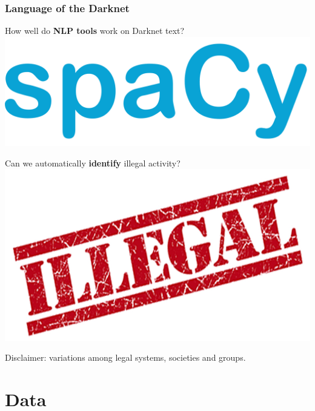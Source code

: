 \documentclass[t,xcolor={svgnames,table}]{beamer}
\begin{document}
\begin{frame}
	\frametitle{Language of the Darknet}
	
	\begin{center}
	How well do \textbf{NLP tools} work on Darknet text?
	\includegraphics[width=.4\textwidth]{spacy.png}
	\vfill
	\pause
	
	Can we automatically \textbf{identify} illegal activity?
	\includegraphics[width=.4\textwidth]{illegal.jpg}
	\vfill
	\pause
	
	Disclaimer:
	variations among legal systems, societies and groups.
	\end{center}
\end{frame}

\section{Data}
\end{document}
